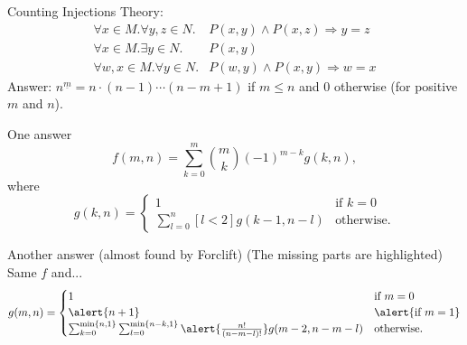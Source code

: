 \documentclass{beamer}
\begin{document}
\begin{frame}{Counting Injections}
  Theory:
  \begin{align*}
    \forall x \in M. \forall y, z \in N. &P(x, y) \land P(x, z) \Rightarrow y=z \\
    \forall x \in M. \exists y \in N. &P(x, y) \\
    \forall w, x \in M. \forall y \in N. &P(w, y) \land P(x, y) \Rightarrow w=x
  \end{align*}
  Answer: $n^{\underline{m}} = n \cdot (n-1)\cdots(n-m+1)$ if $m \le n$ and $0$ otherwise (for positive $m$ and $n$).
\end{frame}

\begin{frame}
  \begin{block}{One answer}
    \[
    f(m, n) = \sum_{k=0}^m \binom{m}{k}(-1)^{m-k}g(k, n),
    \]
    where
    \[
    g(k, n) =
    \begin{cases}
      1 & \text{if } k = 0 \\
      \sum_{l=0}^n [l < 2]g(k-1, n-l) & \text{otherwise.}
    \end{cases}
    \]
  \end{block}
  \begin{block}{Another answer (almost found by Forclift)}
    (The missing parts are highlighted) Same $f$ and...
    \[
    g(m, n) =
    \begin{cases}
      1 & \text{if } m = 0 \\
      \alert{n+1} & \alert{\text{if } m = 1} \\
      \sum_{k=0}^{\min\{n, 1\}} \sum_{l=0}^{\min\{n-k, 1\}} \alert{\frac{n!}{(n-m-l)!}} g(m-2, n-m-l) & \text{otherwise.}
    \end{cases}
    \]
  \end{block}
\end{frame}
\end{document}
